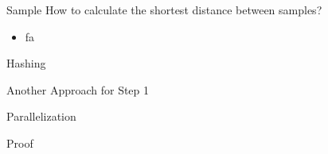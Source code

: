 \documentclass[18pt]{beamer}
\begin{document}

\begin{frame}{Sample}
How to calculate the shortest distance between samples?
\begin{itemize}
	\item fa
	
\end{itemize}
\end{frame}


\begin{frame}{Hashing}

\end{frame}

\begin{frame}{Another Approach for Step 1}

\end{frame}

\begin{frame}{Parallelization}

\end{frame}

\begin{frame}{Proof}

\end{frame}
%
\end{document}
